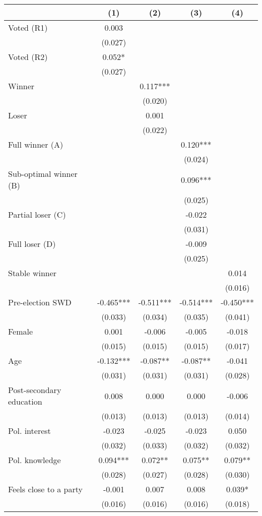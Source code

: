 \begin{tabular}[t]{lcccc}
\toprule
  & (1) & (2) & (3) & (4)\\
\midrule
Voted (R1) & 0.003 &  &  & \\
 & (0.027) &  &  \vphantom{1} & \\
Voted (R2) & 0.052* &  &  & \\
 & (0.027) &  &  & \\
Winner &  & 0.117*** &  & \\
 &  & (0.020) &  & \\
Loser &  & 0.001 &  & \\
 &  & (0.022) &  & \\
Full winner (A) &  &  & 0.120*** & \\
 &  &  & (0.024) & \\
Sub-optimal winner (B) &  &  & 0.096*** & \\
 &  &  & (0.025) \vphantom{1} & \\
Partial loser (C) &  &  & -0.022 & \\
 &  &  & (0.031) & \\
Full loser (D) &  &  & -0.009 & \\
 &  &  & (0.025) & \\
Stable winner &  &  &  & 0.014\\
 &  &  &  & (0.016)\\
Pre-election SWD & -0.465*** & -0.511*** & -0.514*** & -0.450***\\
 & (0.033) & (0.034) & (0.035) & (0.041)\\
Female & 0.001 & -0.006 & -0.005 & -0.018\\
 & (0.015) & (0.015) & (0.015) & (0.017)\\
Age & -0.132*** & -0.087** & -0.087** & -0.041\\
 & (0.031) & (0.031) & (0.031) & (0.028)\\
Post-secondary education & 0.008 & 0.000 & 0.000 & -0.006\\
 & (0.013) & (0.013) & (0.013) & (0.014)\\
Pol. interest & -0.023 & -0.025 & -0.023 & 0.050\\
 & (0.032) & (0.033) & (0.032) & (0.032)\\
Pol. knowledge & 0.094*** & 0.072** & 0.075** & 0.079**\\
 & (0.028) & (0.027) & (0.028) & (0.030)\\
Feels close to a party & -0.001 & 0.007 & 0.008 & 0.039*\\
 & (0.016) & (0.016) & (0.016) & (0.018)\\

\end{tabular}
